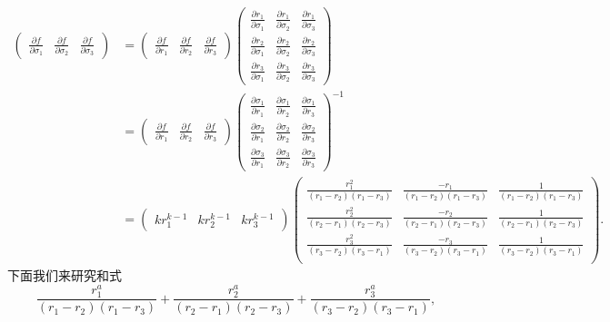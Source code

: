 \documentclass[twoside,11pt]{article} \usepackage{amsmath,amsfonts,bm}
\newcommand{\pa}{\partial} \newcommand{\Om}{\Omega}
\begin{document}
\begin{align*}
  \begin{pmatrix}
    \frac{\pa f}{\pa \sigma_1}&\frac{\pa f}{\pa \sigma_2}&\frac{\pa
      f}{\pa \sigma_3}
  \end{pmatrix}&=\begin{pmatrix} \frac{\pa f}{\pa r_1}&\frac{\pa
      f}{\pa r_2}&\frac{\pa f}{\pa r_3}
  \end{pmatrix}\begin{pmatrix}
    \frac{\pa r_1}{\pa \sigma_1}&\frac{\pa r_1}{\pa
      \sigma_2}&\frac{\pa
      r_1}{\pa \sigma_3}\\
    \frac{\pa r_2}{\pa \sigma_1}&\frac{\pa r_2}{\pa
      \sigma_2}&\frac{\pa
      r_2}{\pa \sigma_3}\\
    \frac{\pa r_3}{\pa \sigma_1}&\frac{\pa r_3}{\pa
      \sigma_2}&\frac{\pa r_3}{\pa \sigma_3}
  \end{pmatrix}\\&=\begin{pmatrix}
    \frac{\pa f}{\pa r_1}&\frac{\pa f}{\pa r_2}&\frac{\pa f}{\pa r_3}
  \end{pmatrix}\begin{pmatrix}
    \frac{\pa \sigma_1}{\pa r_1}&\frac{\pa \sigma_1}{\pa
      r_2}&\frac{\pa \sigma_1}{\pa r_3}\\
\frac{\pa \sigma_2}{\pa r_1}&\frac{\pa \sigma_2}{\pa r_2}&\frac{\pa
  \sigma_2}{\pa r_3}\\
\frac{\pa\sigma_3}{\pa r_1}&\frac{\pa \sigma_3}{\pa r_2}&\frac{\pa
  \sigma_3}{\pa r_3}
  \end{pmatrix}^{-1}\\&=\begin{pmatrix}
    kr_1^{k-1}&kr_2^{k-1}&kr_3^{k-1}
  \end{pmatrix}\begin{pmatrix}
  \frac{r_1^2}{(r_1-r_2)(r_1-r_3)}&\frac{-r_1}{(r_1-r_2)(r_1-r_3)}&\frac{1}{(r_1-r_2)(r_1-r_3)}\\
  \frac{r_2^2}{(r_2-r_1)(r_2-r_3)}&\frac{-r_2}{(r_2-r_1)(r_2-r_3)}&\frac{1}{(r_2-r_1)(r_2-r_3)}\\
  \frac{r_3^2}{(r_3-r_2)(r_3-r_1)}&\frac{-r_3}{(r_3-r_2)(r_3-r_1)}&\frac{1}{(r_3-r_2)(r_3-r_1)}\\            
  \end{pmatrix}.
\end{align*}
下面我们来研究和式
\begin{equation}\label{eq:11.10}
\frac{r_1^a}{(r_1-r_2)(r_1-r_3)}+\frac{r_2^a}{(r_2-r_1)(r_2-r_3)}+\frac{r_3^a}{(r_3-r_2)(r_3-r_1)},
\end{equation}
\end{document}
